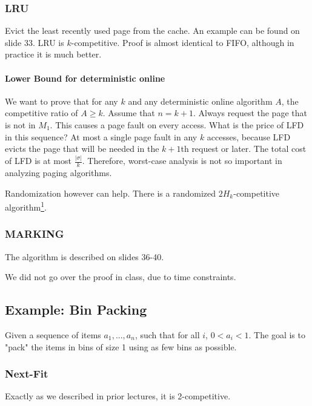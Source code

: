 \documentclass[a4paper]{article}
\begin{document}
\subsubsection{LRU}
Evict the least recently used page from the cache.
An example can be found on slide 33.
LRU is $k$-competitive. Proof is almost identical to FIFO, although in practice it is much better.

\paragraph{Lower Bound for deterministic online}
We want to prove that for any $k$ and any deterministic online algorithm $A$, the competitive ratio of $A \ge k$.
Assume that $n=k+1$. Always request the page that is not in $M_1$. This causes a page fault on every access.
What is the price of LFD in this sequence?
At most a single page fault in any $k$ accesses, because LFD evicts the page that will be needed in the $k+1$th request or later.
The total cost of LFD is at most $\frac{|\sigma|}{k}$.
Therefore, worst-case analysis is not so important in analyzing paging algorithms.

Randomization however can help. There is a randomized $2H_k$-competitive algorithm\footnote{$H_k=1+\frac{1}{2}+\frac{1}{3}+...+\frac{1}{k}=O(\ln k)$}.

\subsubsection{MARKING}
The algorithm is described on slides 36-40.

We did not go over the proof in class, due to time constraints.

\subsection{Example: Bin Packing}
Given a sequence of items $a_1,...,a_n$, such that for all $i$, $0 < a_i < 1$.
The goal is to "pack" the items in bins of size 1 using as few bins as possible.

\subsubsection{Next-Fit}
Exactly as we described in prior lectures, it is 2-competitive.

\subsubsection{First-Fit}
Exactly as we described in prior lectures, it is 1.7-competitive.

\subsubsection{HARMONIC-k}
Classify items into $k$ intervals according to size.

Examples can be found on slide 43.
Analysis and proofs can be found on later slides.
\end{document}
